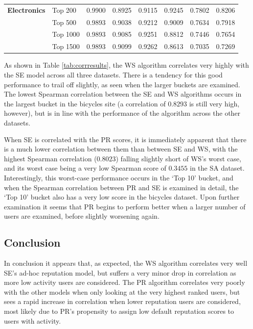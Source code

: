 \documentclass[]{final_report}
\begin{document}
\begin{minipage}{\linewidth}
\begin{tabular}{|l|l||l|l|l||l|l|l|}
\textbf{Electronics}& Top 200   & 0.9900 & 0.8925 & 0.9115 & 0.9245 & 0.7802 & 0.8206 \\
~           		& Top 500   & 0.9893 & 0.9038 & 0.9212 & 0.9009 & 0.7634 & 0.7918 \\
~           		& Top 1000  & 0.9893 & 0.9085 & 0.9251 & 0.8812 & 0.7446 & 0.7654 \\
~           		& Top 1500	& 0.9893 & 0.9099 & 0.9262 & 0.8613 & 0.7035 & 0.7269 \\
\hline
\end{tabular}\par
{} 
\label{tab:corrresults}
\end{minipage}

As shown in Table \ref{tab:corrresults}, the WS algorithm correlates very highly with the SE model across all three datasets. There is a tendency for this good performance to trail off slightly, as seen when the larger buckets are examined. The lowest Spearman correlation between the SE and WS algorithms occurs in the largest bucket in the bicycles site (a correlation of $0.8293$ is still very high, however), but is in line with the performance of the algorithm across the other datasets.

When SE is correlated with the PR scores, it is immediately apparent that there is a much lower correlation between them than between SE and WS, with the highest Spearman correlation ($0.8023$) falling slightly short of WS's worst case, and its worst case being a very low Spearman score of $0.3455$ in the SA dataset. Interestingly, this worst-case performance occurs in the `Top 10' bucket, and when the Spearman correlation between PR and SE is examined in detail, the `Top 10' bucket also has a very low score in the bicycles dataset. Upon further examination it seems that PR begins to perform better when a larger number of users are examined, before slightly worsening again.

\subsection{Conclusion}

In conclusion it appears that, as expected, the WS algorithm correlates very well SE's ad-hoc reputation model, but suffers a very minor drop in correlation as more low activity users are considered. The PR algorithm correlates very poorly with the other models when only looking at the very highest ranked users, but sees a rapid increase in correlation when lower reputation users are considered, most likely due to PR's propensity to assign low default reputation scores to users with activity.
\end{document}
